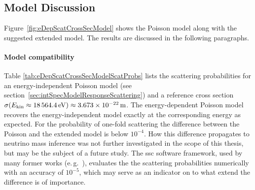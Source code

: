 \subsection{Model Discussion}
\label{sec:eDepScatCrossSecModelDiscussion}
Figure~\ref{fig:eDepScatCrossSecModel} shows the Poisson model along with the suggested extended model. The results are discussed in the following paragraphs.

\paragraph{Model compatibility}
Table \ref{tab:eDepScatCrossSecModelScatProbs} lists the scattering probabilities for an energy-independent Poisson model (see section~\ref{sec:intSpecModelResponseScattering}) and a reference cross section $\sigma(E_\mathrm{kin}\approx\SI{18564.4}{eV})\approx\SI{3.673e-22}{m}$. The energy-dependent Poisson model recovers the energy-independent model exactly at the corresponding energy as expected. For the probability of one-fold scattering the difference between the Poisson and the extended model is below $10^{-4}$. How this difference propagates to neutrino mass inference was not further investigated in the scope of this thesis, but may be the subject of a future study. The \gls{ssc} software framework, used by many former works (e.\,g.~\cite{Groh2015,Kleesiek2014,SeitzM2019}), evaluates the the scattering probabilities numerically with an accuracy of $10^{-5}$, which may serve as an indicator on to what extend the difference is of importance.


